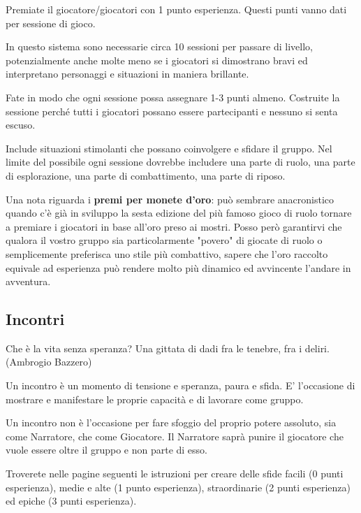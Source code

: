 \documentclass[a4paper,11pt,twoside,openany]{book}
\begin{document}
\bigskip

Premiate il giocatore/giocatori con 1 punto esperienza. Questi punti vanno dati per sessione di gioco.

In questo sistema sono necessarie circa 10 sessioni per passare di livello, potenzialmente anche molte meno se i giocatori si dimostrano bravi ed interpretano personaggi e situazioni in maniera brillante.

Fate in modo che ogni sessione possa assegnare 1-3 punti almeno. Costruite la sessione perché tutti i giocatori possano essere partecipanti e nessuno si senta escuso.

Include situazioni stimolanti che possano coinvolgere e sfidare il gruppo.
Nel limite del possibile ogni sessione dovrebbe includere una parte di ruolo, una parte di esplorazione, una parte di combattimento, una parte di riposo.

\bigskip

Una nota riguarda i \textbf{premi per monete d'oro}: può sembrare anacronistico quando c'è già in sviluppo la sesta edizione del più famoso gioco di ruolo tornare a premiare i giocatori in base all'oro preso ai mostri. Posso però garantirvi che qualora il vostro gruppo sia particolarmente "povero" di giocate di ruolo o semplicemente preferisca uno stile più combattivo, sapere che l'oro raccolto equivale ad esperienza può rendere molto più dinamico ed avvincente l'andare in avventura.

\subsection{Incontri}


\begin{tcolorbox}[enhanced,arc=5pt,boxrule=0.3pt]{Che è la vita senza speranza? Una gittata di dadi fra le tenebre, fra i deliri. (Ambrogio Bazzero)}\end{tcolorbox}\medskip

\label{incontri}

Un incontro è un momento di tensione e speranza, paura e sfida. E' l'occasione di mostrare e manifestare le proprie capacità e di lavorare come gruppo.

Un incontro non è l'occasione per fare sfoggio del proprio potere assoluto, sia come Narratore, che come Giocatore. Il Narratore saprà punire il giocatore che vuole essere oltre il gruppo e non parte di esso.

Troverete nelle pagine seguenti le istruzioni per creare delle sfide facili (0 punti esperienza), medie e alte (1 punto esperienza), straordinarie (2 punti esperienza) ed epiche (3 punti esperienza).
\end{document}
